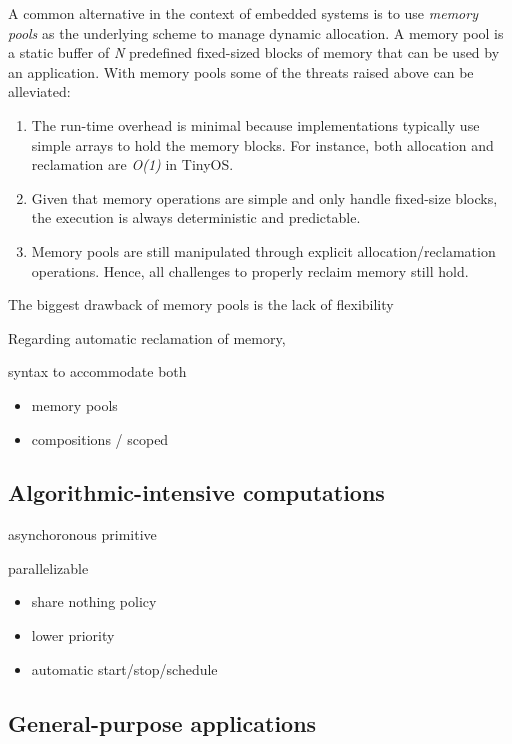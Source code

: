 \documentclass[pdftex,12pt,a4paper]{article}
\begin{document}
A common alternative in the context of embedded systems is to use \emph{memory 
pools} as the underlying scheme to manage dynamic allocation.
A memory pool is a static buffer of \emph{N} predefined fixed-sized blocks of 
memory that can be used by an application.
%
With memory pools some of the threats raised above can be alleviated:

\begin{enumerate}
\item
The run-time overhead is minimal because implementations typically use simple 
arrays to hold the memory blocks.
For instance, both allocation and reclamation are \emph{O(1)} in TinyOS.
\item
Given that memory operations are simple and only handle fixed-size blocks, the 
execution is always deterministic and predictable.
\item
Memory pools are still manipulated through explicit allocation/reclamation 
operations.
Hence, all challenges to properly reclaim memory still hold.
\end{enumerate}

The biggest drawback of memory pools is the lack of flexibility


Regarding automatic reclamation of memory,

syntax to accommodate both

\begin{itemize}
    \item memory pools
    \item compositions / scoped
\end{itemize}

\subsection{Algorithmic-intensive computations}

asynchoronous primitive

parallelizable

\begin{itemize}
    \item share nothing policy
    \item lower priority
    \item automatic start/stop/schedule
\end{itemize}

\subsection{General-purpose applications}
\end{document}

